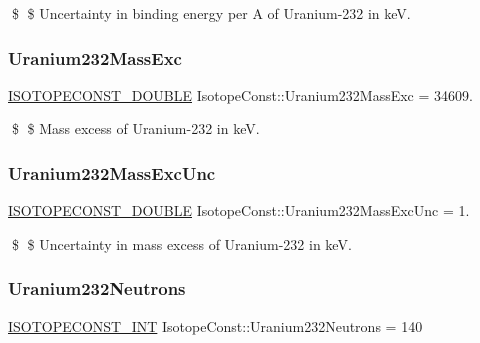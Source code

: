 \$ \$ Uncertainty in binding energy per A of Uranium-\/232 in keV. \mbox{\label{group___isotope_const-_uranium-_u232_gaf69f7fda711ab96cafc7df32a0dc2dc6}} 
\subsubsection{\texorpdfstring{Uranium232\+Mass\+Exc}{Uranium232MassExc}}
{\footnotesize\ttfamily \mbox{\hyperlink{group___isotope_const-_macros_ga8f45a7272ce02c0b4c65c44636ed719a}{I\+S\+O\+T\+O\+P\+E\+C\+O\+N\+S\+T\+\_\+\+D\+O\+U\+B\+LE}} Isotope\+Const\+::\+Uranium232\+Mass\+Exc = 34609.}

\$ \$ Mass excess of Uranium-\/232 in keV. \mbox{\label{group___isotope_const-_uranium-_u232_gae9ac7af7620f132261b64e6c150d055d}} 
\subsubsection{\texorpdfstring{Uranium232\+Mass\+Exc\+Unc}{Uranium232MassExcUnc}}
{\footnotesize\ttfamily \mbox{\hyperlink{group___isotope_const-_macros_ga8f45a7272ce02c0b4c65c44636ed719a}{I\+S\+O\+T\+O\+P\+E\+C\+O\+N\+S\+T\+\_\+\+D\+O\+U\+B\+LE}} Isotope\+Const\+::\+Uranium232\+Mass\+Exc\+Unc = 1.}

\$ \$ Uncertainty in mass excess of Uranium-\/232 in keV. \mbox{\label{group___isotope_const-_uranium-_u232_gaccbebaada7d6fb397d15e64b536f3954}} 
\subsubsection{\texorpdfstring{Uranium232\+Neutrons}{Uranium232Neutrons}}
{\footnotesize\ttfamily \mbox{\hyperlink{group___isotope_const-_macros_ga5f18360b3e99483a35c32d789e62621c}{I\+S\+O\+T\+O\+P\+E\+C\+O\+N\+S\+T\+\_\+\+I\+NT}} Isotope\+Const\+::\+Uranium232\+Neutrons = 140}


